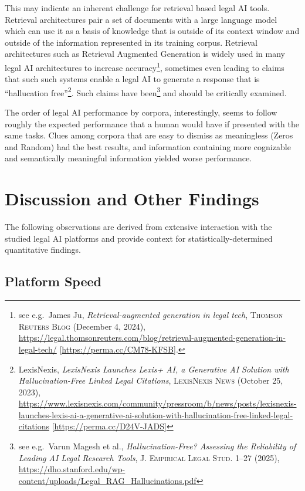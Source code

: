 \documentclass[
]{article}
\begin{document}
This may indicate an inherent challenge for retrieval based legal AI tools. Retrieval architectures pair a set of documents with a large language model which can use it as a basis of knowledge that is outside of its context window and outside of the information represented in its training corpus. Retrieval architectures such as Retrieval Augmented Generation is widely used in many legal AI architectures to increase accuracy\footnote{see e.g.~James Ju, \emph{Retrieval-augmented generation in legal tech}, \textsc{Thomson Reuters Blog} (December 4, 2024), \url{https://legal.thomsonreuters.com/blog/retrieval-augmented-generation-in-legal-tech/} {[}\url{https://perma.cc/CM78-KFSB}{]}.}, sometimes even leading to claims that such such systems enable a legal AI to generate a response that is ``hallucation free''\footnote{LexisNexis, \emph{LexisNexis Launches Lexis+ AI, a Generative AI Solution with Hallucination-Free Linked Legal Citations}, \textsc{LexisNexis News} (October 25, 2023), \url{https://www.lexisnexis.com/community/pressroom/b/news/posts/lexisnexis-launches-lexis-ai-a-generative-ai-solution-with-hallucination-free-linked-legal-citations} {[}\url{https://perma.cc/D24V-JADS}{]}}. Such claims have been\footnote{see e.g.~Varun Magesh et al., \emph{Hallucination-Free? Assessing the Reliability of Leading AI Legal Research Tools}, \textsc{J. Empirical Legal Stud.} 1--27 (2025), \url{https://dho.stanford.edu/wp-content/uploads/Legal_RAG_Hallucinations.pdf}} and should be critically examined.

The order of legal AI performance by corpora, interestingly, seems to follow roughly the expected performance that a human would have if presented with the same tasks. Clues among corpora that are easy to dismiss as meaningless (Zeros and Random) had the best results, and information containing more cognizable and semantically meaningful information yielded worse performance.

\section{Discussion and Other Findings}\label{discussion-and-other-findings}

The following observations are derived from extensive interaction with the studied legal AI platforms and provide context for statistically-determined quantitative findings.

\subsection{Platform Speed}\label{platform-speed}
\end{document}
